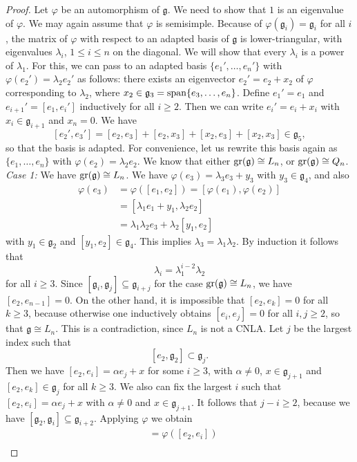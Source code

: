 \documentclass[12pt]{amsart}
\theoremstyle{definition}
\theoremstyle{remark}
\newcommand{\Lg}{\mathfrak{g}}
\newcommand{\al}{\alpha}
\newcommand{\la}{\lambda}
\renewcommand{\phi}{\varphi}
\begin{document}
\begin{proof}
Let $\phi$ be an automorphism of $\Lg$. We need to show that $1$ is an eigenvalue of $\phi$. We may again assume
that $\phi$ is semisimple. Because of $\phi(\Lg_i)=\Lg_i$ for all $i$, the matrix of $\phi$ with respect to
an adapted basis of $\Lg$ is lower-triangular, with eigenvalues $\la_i$, $1\le i\le n$ on the diagonal.
We will show that every $\la_i$ is a power of $\la_1$. For this, we can pass to an adapted basis
$\{e_1',\ldots ,e_n' \}$ with $\phi(e_2')=\la_2e_2'$ as follows: there exists an eigenvector $e_2'=e_2+x_2$ of
$\phi$ corresponding to $\la_2$, where $x_2\in \Lg_3={\rm span}\{e_3,\ldots ,e_n\}$. Define $e_1'=e_1$ and
$e_{i+1}'=[e_1,e_i']$ inductively for all $i\ge 2$. Then we can write $e_i'=e_i+x_i$ with $x_i\in \Lg_{i+1}$ and $x_n=0$.
We have
\[
[e_2',e_3']=[e_2,e_3]+[e_2,x_3]+[x_2,e_3]+[x_2,x_3]\in \Lg_5,
\]
so that the basis is adapted. For convenience, let us rewrite this basis again as $\{e_1,\ldots ,e_n \}$
with $\phi(e_2)=\la_2e_2$. We know that either ${\rm gr}(\Lg)\cong L_n$, or ${\rm gr}(\Lg)\cong Q_n$. \\[0.2cm]
{\em Case 1:} We have ${\rm gr}(\Lg)\cong L_n$. We have $\phi(e_3)=\la_3e_3+y_3$ with $y_3\in \Lg_4$, and also
\begin{align*}
\phi(e_3) & = \phi([e_1,e_2])=[\phi(e_1),\phi(e_2)] \\
          & = [\la_1e_1+y_1,\la_2e_2] \\
          & = \la_1\la_2e_3+\la_2[y_1,e_2]
\end{align*}
with $y_1\in \Lg_2$ and $[y_1,e_2]\in \Lg_4$. This implies $\la_3=\la_1\la_2$. By induction it follows that
\[
\la_i=\la_1^{i-2}\la_2
\]
for all $i\ge 3$. Since $[\Lg_i,\Lg_j]\subseteq \Lg_{i+j}$ for the case ${\rm gr}(\Lg)\cong L_n$, we have
$[e_2,e_{n-1}]=0$. On the other hand, it is impossible that $[e_2,e_k]=0$ for all $k\ge 3$, because
otherwise one inductively obtains $[e_i,e_j]=0$ for all $i,j\ge 2$, so that $\Lg\cong L_n$. This is a contradiction, since
$L_n$ is not a CNLA. Let $j$ be the largest index such that
\[
[e_2,\Lg_2]\subset \Lg_j.
\]
Then we have $[e_2,e_i]=\al e_j+x$ for some $i\ge 3$, with $\al\neq 0$, $x\in \Lg_{j+1}$ and $[e_2,e_k]\in \Lg_j$
for all $k\ge 3$. We also can fix the largest $i$ such that $[e_2,e_i]=\al e_j+x$ with $\al \neq 0$ and $x\in \Lg_{j+1}$.
It follows that $j-i\ge 2$, because we have $[\Lg_2,\Lg_i]\subseteq \Lg_{i+2}$. Applying $\phi$ we obtain
\begin{align*}
[\phi(e_2),\phi(e_i)] & = \phi([e_2,e_i]) \\

\end{align*}
\end{proof}
\end{document}
